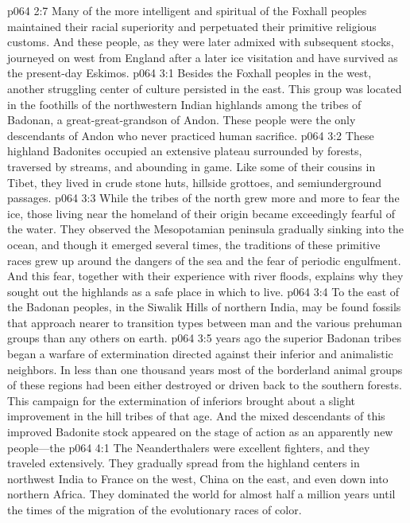 \vs p064 2:7 Many of the more intelligent and spiritual of the Foxhall peoples maintained their racial superiority and perpetuated their primitive religious customs. And these people, as they were later admixed with subsequent stocks, journeyed on west from England after a later ice visitation and have survived as the present\hyp{}day Eskimos.
\vs p064 3:1 Besides the Foxhall peoples in the west, another struggling center of culture persisted in the east. This group was located in the foothills of the northwestern Indian highlands among the tribes of Badonan, a great\hyp{}great\hyp{}grandson of Andon. These people were the only descendants of Andon who never practiced human sacrifice.
\vs p064 3:2 These highland Badonites occupied an extensive plateau surrounded by forests, traversed by streams, and abounding in game. Like some of their cousins in Tibet, they lived in crude stone huts, hillside grottoes, and semiunderground passages.\plusone
\vs p064 3:3 While the tribes of the north grew more and more to fear the ice, those living near the homeland of their origin became exceedingly fearful of the water. They observed the Mesopotamian peninsula gradually sinking into the ocean, and though it emerged several times, the traditions of these primitive races grew up around the dangers of the sea and the fear of periodic engulfment. And this fear, together with their experience with river floods, explains why they sought out the highlands as a safe place in which to live.
\vs p064 3:4 To the east of the Badonan peoples, in the Siwalik Hills of northern India, may be found fossils that approach nearer to transition types between man and the various prehuman groups than any others on earth.
\pc \vs p064 3:5  years ago the superior Badonan tribes began a warfare of extermination directed against their inferior and animalistic neighbors. In less than one thousand years most of the borderland animal groups of these regions had been either destroyed or driven back to the southern forests. This campaign for the extermination of inferiors brought about a slight improvement in the hill tribes of that age. And the mixed descendants of this improved Badonite stock appeared on the stage of action as an apparently new people---the 
\vs p064 4:1 The Neanderthalers were excellent fighters, and they traveled extensively. They gradually spread from the highland centers in northwest India to France on the west, China on the east, and even down into northern Africa. They dominated the world for almost half a million years until the times of the migration of the evolutionary races of color.
